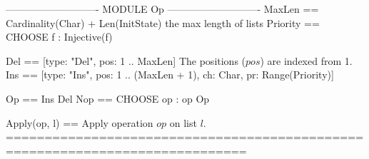 \documentclass{article}
\begin{document}
\begin{tla}
---------------------------- MODULE Op ----------------------------
MaxLen == Cardinality(Char) + Len(InitState) \* the max length of lists
Priority == CHOOSE f  : Injective(f)

Del == [type: {"Del"}, pos: 1 .. MaxLen] \* The positions ($pos$) are indexed from 1.
Ins == [type: {"Ins"}, pos: 1 .. (MaxLen + 1), ch: Char, pr: Range(Priority)]

Op == Ins \cup Del
Nop == CHOOSE op : op \notin Op

Apply(op, l) == \* Apply operation $op$ on list $l$.
=============================================================================
\end{tla}
\end{document}
